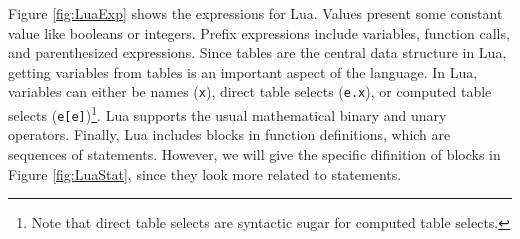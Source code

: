 Figure \ref{fig:LuaExp} shows the expressions for Lua.
Values present some constant value like booleans or integers.
Prefix expressions include variables, function calls, and parenthesized expressions.
Since tables are the central data structure in Lua,
getting variables from tables is an important aspect of the language.
In Lua, variables can either be names ({\tt x}), direct table selects ({\tt e.x}), or computed table selects ({\tt e[e]})\footnote{
Note that direct table selects are syntactic sugar for computed table selects.
}.
Lua supports the usual mathematical binary and unary operators.
Finally, Lua includes blocks in function definitions, which are sequences of statements.
However, we will give the specific difinition of blocks in Figure \ref{fig:LuaStat}, since they look more related to statements.

\newcommand{\mydefhead}[2]{\multicolumn{2}{l}{{#1}}&\mbox{\emph{#2}}\\}
\newcommand{\mydefcase}[2]{\qquad\qquad& #1 &\mbox{#2}\\}

\newcommand{\functiondef}[2]{\mbox{\tt function}~(\overline{#1_i})~#2~ {\tt end}}


